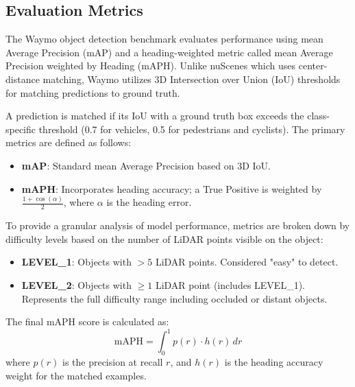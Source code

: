 \subsection{Evaluation Metrics}
The Waymo object detection benchmark evaluates performance using mean Average Precision (mAP) and a heading-weighted metric called mean Average Precision weighted by Heading (mAPH). Unlike nuScenes which uses center-distance matching, Waymo utilizes 3D Intersection over Union (IoU) thresholds for matching predictions to ground truth.

A prediction is matched if its IoU with a ground truth box exceeds the class-specific threshold (0.7 for vehicles, 0.5 for pedestrians and cyclists). The primary metrics are defined as follows:

\begin{itemize}
    \item \textbf{mAP}: Standard mean Average Precision based on 3D IoU.
    \item \textbf{mAPH}: Incorporates heading accuracy; a True Positive is weighted by $\frac{1 + \cos(\alpha)}{2}$, where $\alpha$ is the heading error.
\end{itemize}

To provide a granular analysis of model performance, metrics are broken down by difficulty levels based on the number of LiDAR points visible on the object:

\begin{itemize}
    \item \textbf{LEVEL\_1}: Objects with $>5$ LiDAR points. Considered "easy" to detect.
    \item \textbf{LEVEL\_2}: Objects with $\ge 1$ LiDAR point (includes LEVEL\_1). Represents the full difficulty range including occluded or distant objects.
\end{itemize}

The final mAPH score is calculated as:
\begin{equation}
    \text{mAPH} = \int_{0}^{1} p(r) \cdot h(r) \, dr
\end{equation}
\noindent where $p(r)$ is the precision at recall $r$, and $h(r)$ is the heading accuracy weight for the matched examples.